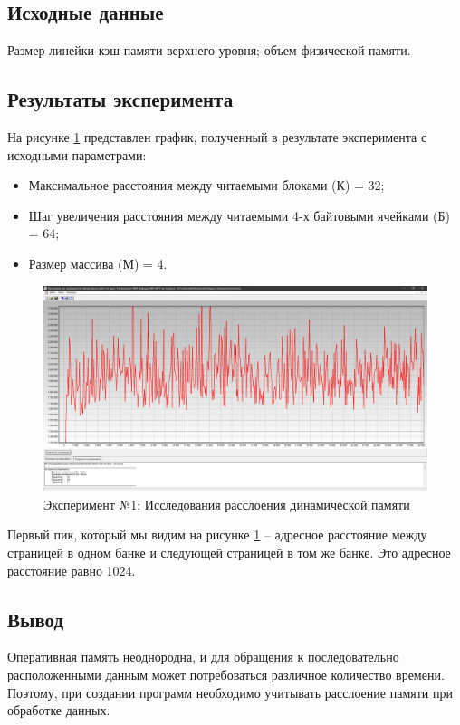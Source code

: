 \subsection*{Исходные данные}
Размер линейки кэш-памяти верхнего уровня; объем физической памяти.

\clearpage

\subsection*{Результаты эксперимента}
На рисунке \ref{ex:t1} представлен график, полученный в результате эксперимента с исходными параметрами:
\begin{itemize}
	\item Максимальное расстояния между	читаемыми блоками (К) = 32;
	\item Шаг увеличения расстояния между читаемыми 4-х байтовыми ячейками (Б) = 64;
	\item Размер массива (М) = 4.
\end{itemize}

\begin{figure}[h]
	\centering
	\includegraphics[height=0.35\textheight]{img/t1}
	\caption{Эксперимент №1: Исследования расслоения динамической памяти}
	\label{ex:t1}
\end{figure}

Первый пик, который мы видим на рисунке \ref{ex:t1} -- адресное расстояние между страницей в одном банке и следующей страницей в том же банке. Это адресное расстояние равно 1024.

\newpage

\subsection*{Вывод}
Оперативная память неоднородна, и для обращения к последовательно расположенными данным может потребоваться различное количество времени. Поэтому, при создании программ необходимо учитывать расслоение памяти при обработке данных.

